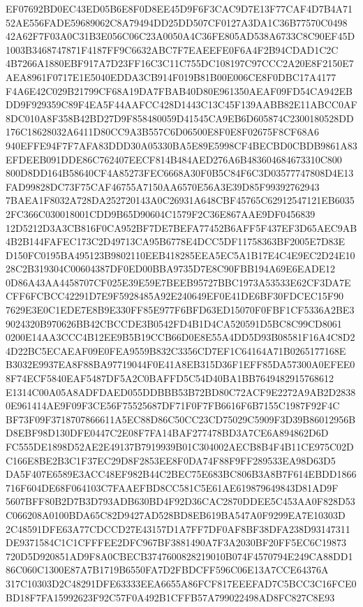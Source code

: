 \documentclass[UTF8,fontset=fandol,zihao=-4,a4paper]{ctexart}
\begin{document}
{{EF07692BD0EC43ED05B6E8F0D8EE45D9F6F3CAC9D7E13F77CAF4D7B4A7152AE556FADE59689062C8A79494DD25DD507CF0127A3DA1C36B77570C0498
42A62F7F03A0C31B3E056C06C23A0050A4C36FE805AD538A6733C8C90EF45D1003B3468747871F4187FF9C6632ABC7F7EAEEFE0F6A4F2B94CDAD1C2C
4B7266A1880EBF917A7D23FF16C3C11C755DC108197C97CCC2A20E8F2150E7AEA8961F0717E1E5040EDDA3CB914F019B81B00E006CE8F0DBC17A4177
F4A6E42C029B21799CF68A19DA7FBAB40D80E961350AEAF09FD54CA942EBDD9F929359C89F4EA5F44AAFCC428D1443C13C45F139AABB82E11ABCC0AF
8DC010A8F358B42BD27D9F858480059D41545CA9EB6D605874C2300180528DD176C18628032A6411D80CC9A3B557C6D06500E8F0E8F02675F8CF68A6
940EFFE94F7F7AFA83DDD30A05330BA5E89E5998CF4BECBD0CBDB9861A83EFDEEB091DDE86C762407EECF814B484AED276A6B483604684673310C800
800D8DD164B58640CF4A85273FEC6668A30F0B5C84F6C3D03577747808D4E13FAD99828DC73F75CAF46755A7150AA6570E56A3E39D85F99392762943
7BAEA1F8032A728DA252720143A0C26931A648CBF45765C62912547121EB60352FC366C030018001CDD9B65D90604C1579F2C36E867AAE9DF0456839
12D5212D3A3CB816F0CA952BF7DE7BEFA77452B6AFF5F437EF3D65AEC9AB4B2B144FAFEC173C2D49713CA95B6778E4DCC5DF11758363BF2005E7D83E
D150FC0195BA495123B9802110EEB418285EEA5EC5A1B17E4C4E9EC2D24E1028C2B319304C00604387DF0ED00BBA9735D7E8C90FBB194A69E6EADE12
0D86A43AA4458707CF025E39E59E7BEEB95727BBC1973A53533E62CF3DA7ECFF6FCBCC42291D7E9F5928485A92E240649EF0E41DE6BF30FDCEC15F90
7629E3E0C1EDE7E8B9E330FF85E977F6BFD63ED15070F0FBF1CF5336A2BE39024320B970626BB42CBCCDE3B0542FD4B1D4CA520591D5BC8C99CD8061
0200E14AA3CCC4B12EE9B5B19CCB66D0E8E55A4DD5D93B08581F16A4C8D24D22BC5ECAEAF09E0FEA9559B832C3356CD7EF1C64164A71B0265177168E
B3032E9937EA8F88BA97719044F0E41A8EB315D36F1EFF85DA57300A0EFEE08F74ECF5840EAF5487DF5A2C0BAFFD5C54D40BA1BB7649482915768612
E1314C00A05A8ADFDAED055DDBBB53B72BD80C72ACF9E2272A9AB2D28380E961414AE9F09F3CE56F75525687DF71F0F7FB6616F6B7155C1987F92F4C
BF73F09F3718707866611A5EC88D86C50CC23CD75029C5909F3D39B86012956BD8EBF98D130DFE0447C2E08F7FA14BAF277478BD3A7CE6A894862D6D
FC555DE1898D52AE2E49137B7919939B01C304002AECB8B4F4B11CE975C02DC166E8BE2B3C1F37EC29D8F2853EE8F0DA74F88F9FF289533EA98D63D5
DA5F407E6589E3ACC48EF982B44C2BEC75E683BC806B3A8B7F614EBDD1866716F604DE68F064103C7FAAEFBD8CC581C5E61AE619879649843D81AD9F
5607BFF80B2D7B3D793ADB630BD4F92D36CAC2870DDEE5C453AA0F828D53C066208A0100BDA65C82D9427AD528BD8EB619BA547A0F9299EA7E10303D
2C48591DFE63A77CDCCD27E43157D1A7FF7DF0AF8BF38DFA238D93147311DE9371584C1C1CFFFEE2DFC967BF3881490A7F3A2030BF20FF5EC6C19873
720D5D920851AD9F8A0CBECB3747600828219010B074F4570794E249CA88DD186C060C1300E87A7B1719B6550FA7D2FBDCFF596C06E13A7CCE64376A
317C10303D2C48291DFE63333EEA6655A86FCF817EEEFAD7C5BCC3C16FCE0BD18F7FA15992623F92C57F0A492B1CFFB57A799022498AD8FC827C8E93
}}
\end{document}
